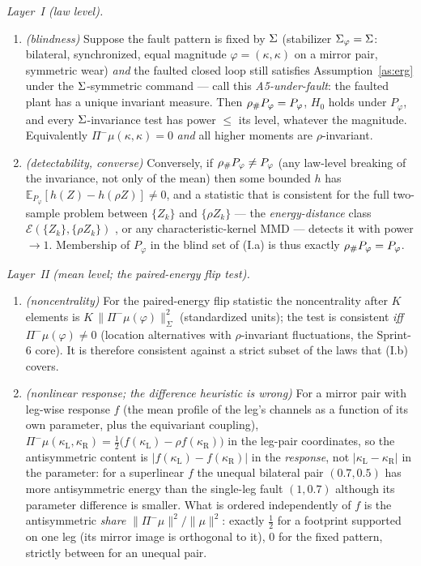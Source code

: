 \begin{theorem}
\label{thm:n1-2}
\emph{Layer~I (law level).}
\begin{enumerate}
\item[(I.a)] \emph{(blindness)} Suppose the fault pattern is fixed by
$\Sigma$ (stabilizer $\Sigma_\varphi = \Sigma$: bilateral, synchronized,
equal magnitude $\varphi = (\kappa,\kappa)$ on a mirror pair, symmetric wear)
\emph{and} the faulted closed loop still satisfies Assumption~\ref{as:erg}
under the $\Sigma$-symmetric command --- call this \emph{A5-under-fault}: the
faulted plant has a unique invariant measure. Then ${\rho}_{\#}P_\varphi =
P_\varphi$, $H_0$ holds under $P_\varphi$, and every $\Sigma$-invariance
test has power $\le$ its level, whatever the magnitude. Equivalently
$\Pi^-\mu(\kappa,\kappa) = 0$ \emph{and} all higher moments are
$\rho$-invariant.
\item[(I.b)] \emph{(detectability, converse)} Conversely, if ${\rho}_{\#}
P_\varphi \neq P_\varphi$ (any law-level breaking of the invariance, not only
of the mean) then some bounded $h$ has $\mathbb{E}_{P_\varphi}[h(Z) -
h(\rho Z)] \neq 0$, and a statistic that is consistent for the full
two-sample problem between $\{Z_k\}$ and $\{\rho Z_k\}$ --- the
\emph{energy-distance} class $\mathcal{E}(\{Z_k\},\{\rho Z_k\})$
\cite{szekely2013energy}, or any characteristic-kernel MMD --- detects it
with power $\to 1$. Membership of $P_\varphi$ in the blind set of (I.a) is
thus exactly ${\rho}_{\#}P_\varphi = P_\varphi$.
\end{enumerate}
\emph{Layer~II (mean level; the paired-energy flip test).}
\begin{enumerate}
\item[(II.a)] \emph{(noncentrality)} For the paired-energy flip statistic the
noncentrality after $K$ elements is $K\,\|\Pi^-\mu(\varphi)\|^2_{\Sigma}$
(standardized units); the test is consistent \emph{iff} $\Pi^-\mu(\varphi)
\neq 0$ (location alternatives with $\rho$-invariant fluctuations, the
Sprint-6 core). It is therefore consistent against a strict subset of the
laws that (I.b) covers.
\item[(II.b)] \emph{(nonlinear response; the difference heuristic is wrong)}
For a mirror pair with leg-wise response $f$ (the mean profile of the leg's
channels as a function of its own parameter, plus the equivariant coupling),
$\Pi^-\mu(\kappa_{\mathrm{L}}, \kappa_{\mathrm{R}}) = \tfrac12\bigl(f(\kappa_{\mathrm{L}})
- \rho f(\kappa_{\mathrm{R}})\bigr)$ in the leg-pair coordinates, so the
antisymmetric content is $|f(\kappa_{\mathrm{L}}) - f(\kappa_{\mathrm{R}})|$
in the \emph{response}, not $|\kappa_{\mathrm{L}} - \kappa_{\mathrm{R}}|$
in the parameter: for a superlinear $f$ the unequal bilateral pair
$(0.7, 0.5)$ has more antisymmetric energy than the single-leg fault
$(1, 0.7)$ although its parameter difference is smaller. What is ordered
independently of $f$ is the antisymmetric \emph{share}
$\|\Pi^-\mu\|^2/\|\mu\|^2$: exactly $\tfrac12$ for a footprint supported on
one leg (its mirror image is orthogonal to it), $0$ for the fixed pattern,
strictly between for an unequal pair.
\end{enumerate}
\end{theorem}

